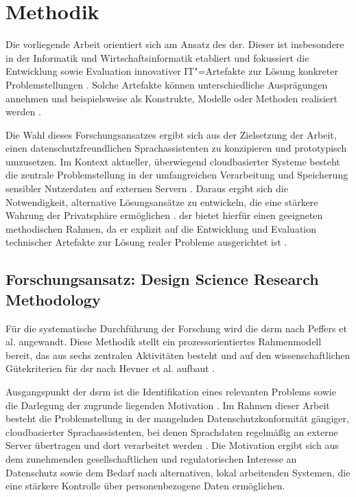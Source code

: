 \chapter{Methodik}
\label{chap:Methodik}
Die vorliegende Arbeit orientiert sich am Ansatz des \gls{dsr}. Dieser ist insbesondere in der Informatik und Wirtschaftsinformatik etabliert und fokussiert die Entwicklung sowie Evaluation innovativer IT"=Artefakte zur Lösung konkreter Problemstellungen \autocite{designScienceResearchMethodology, designScienceResearchInformation}. Solche Artefakte können unterschiedliche Ausprägungen annehmen und beispielsweise als Konstrukte, Modelle oder Methoden realisiert werden \autocite{designScienceResearchMethodology, designScienceResearchInformation}.

Die Wahl dieses Forschungsansatzes ergibt sich aus der Zielsetzung der Arbeit, einen datenschutzfreundlichen Sprachassistenten zu konzipieren und prototypisch umzusetzen. Im Kontext aktueller, überwiegend cloudbasierter Systeme besteht die zentrale Problemstellung in der umfangreichen Verarbeitung und Speicherung sensibler Nutzerdaten auf externen Servern \autocite{alexaKannIchDirVertrauen, EDPBLeitlinienSprachassistenzsysteme}. Daraus ergibt sich die Notwendigkeit, alternative Lösungsansätze zu entwickeln, die eine stärkere Wahrung der Privatsphäre ermöglichen \autocite{alexaKannIchDirVertrauen}. \gls{dsr} bietet hierfür einen geeigneten methodischen Rahmen, da er explizit auf die Entwicklung und Evaluation technischer Artefakte zur Lösung realer Probleme ausgerichtet ist \autocite{designScienceResearchMethodology, designScienceResearchInformation}.

\section{Forschungsansatz: Design Science Research Methodology}
\label{sec:Design_Science_Research_Methodology}
Für die systematische Durchführung der Forschung wird die \gls{dsrm} nach Peffers et al. \autocite{designScienceResearchMethodology} angewandt. Diese Methodik stellt ein prozessorientiertes Rahmenmodell bereit, das aus sechs zentralen Aktivitäten besteht und auf den wissenschaftlichen Gütekriterien für \gls{dsr} nach Hevner et al. aufbaut \autocite{designScienceResearchMethodology, designScienceResearchInformation}.

Ausgangspunkt der \gls{dsrm} ist die Identifikation eines relevanten Problems sowie die Darlegung der zugrunde liegenden Motivation \autocite{designScienceResearchMethodology}. Im Rahmen dieser Arbeit besteht die Problemstellung in der mangelnden Datenschutzkonformität gängiger, cloudbasierter Sprachassistenten, bei denen Sprachdaten regelmäßig an externe Server übertragen und dort verarbeitet werden \autocite{alexaKannIchDirVertrauen, EDPBLeitlinienSprachassistenzsysteme}. Die Motivation ergibt sich aus dem zunehmenden gesellschaftlichen und regulatorischen Interesse an Datenschutz sowie dem Bedarf nach alternativen, lokal arbeitenden Systemen, die eine stärkere Kontrolle über personenbezogene Daten ermöglichen.

